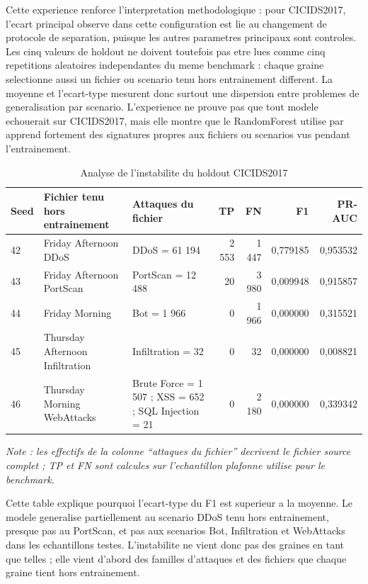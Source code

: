 Cette experience renforce l'interpretation methodologique : pour CICIDS2017, l'ecart principal observe dans cette configuration est lie au changement de protocole de separation, puisque les autres parametres principaux sont controles. Les cinq valeurs de holdout ne doivent toutefois pas etre lues comme cinq repetitions aleatoires independantes du meme benchmark : chaque graine selectionne aussi un fichier ou scenario tenu hors entrainement different. La moyenne et l'ecart-type mesurent donc surtout une dispersion entre problemes de generalisation par scenario. L'experience ne prouve pas que tout modele echouerait sur CICIDS2017, mais elle montre que le RandomForest utilise par \logminer{} apprend fortement des signatures propres aux fichiers ou scenarios vus pendant l'entrainement.

\begin{table}[H]
\centering
\caption{Analyse de l'instabilite du holdout CICIDS2017}
\label{tab:cicids-holdout-instability}
\scriptsize
\begin{tabularx}{\textwidth}{p{1cm}p{3.4cm}Xrrrr}
\toprule
\textbf{Seed} & \textbf{Fichier tenu hors entrainement} & \textbf{Attaques du fichier} & \textbf{TP} & \textbf{FN} & \textbf{F1} & \textbf{PR-AUC} \\
\midrule
42 & Friday Afternoon DDoS & DDoS = 61 194 & 2 553 & 1 447 & 0,779185 & 0,953532 \\
43 & Friday Afternoon PortScan & PortScan = 12 488 & 20 & 3 980 & 0,009948 & 0,915857 \\
44 & Friday Morning & Bot = 1 966 & 0 & 1 966 & 0,000000 & 0,315521 \\
45 & Thursday Afternoon Infiltration & Infiltration = 32 & 0 & 32 & 0,000000 & 0,008821 \\
46 & Thursday Morning WebAttacks & Brute Force = 1 507 ; XSS = 652 ; SQL Injection = 21 & 0 & 2 180 & 0,000000 & 0,339342 \\
\bottomrule
\end{tabularx}
\end{table}

\noindent\footnotesize\textit{Note : les effectifs de la colonne ``attaques du fichier'' decrivent le fichier source complet ; TP et FN sont calcules sur l'echantillon plafonne utilise pour le benchmark.}\normalsize

Cette table explique pourquoi l'ecart-type du F1 est superieur a la moyenne. Le modele generalise partiellement au scenario DDoS tenu hors entrainement, presque pas au PortScan, et pas aux scenarios Bot, Infiltration et WebAttacks dans les echantillons testes. L'instabilite ne vient donc pas des graines en tant que telles ; elle vient d'abord des familles d'attaques et des fichiers que chaque graine tient hors entrainement.

